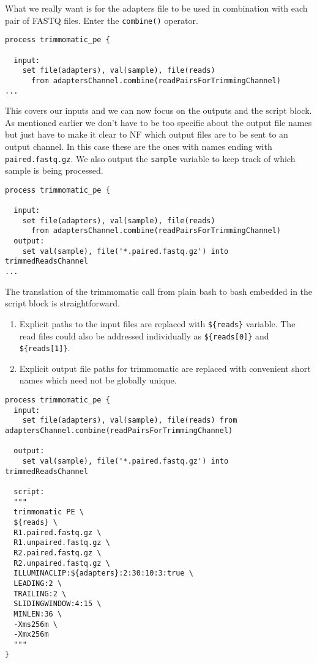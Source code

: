 What we really want is for the adapters file to be used in combination with 
each pair of FASTQ files. Enter the \texttt{combine()} operator.

\begin{lstlisting}
process trimmomatic_pe {

  input:
    set file(adapters), val(sample), file(reads) 
      from adaptersChannel.combine(readPairsForTrimmingChannel)
...
\end{lstlisting}

This covers our inputs and we can now focus on the outputs and the script block.
As mentioned earlier we don't have to be too specific about the output file names 
but just have to make it clear to NF which output files are to be sent to an output channel.
In this case these are the ones with names ending with \texttt{paired.fastq.gz}.
We also output the \texttt{sample} variable to keep track of which sample is being processed.

\begin{lstlisting}
process trimmomatic_pe {

  input:
    set file(adapters), val(sample), file(reads) 
      from adaptersChannel.combine(readPairsForTrimmingChannel)
  output:
    set val(sample), file('*.paired.fastq.gz') into trimmedReadsChannel
...
\end{lstlisting}

The translation of the trimmomatic call from plain bash to bash embedded in the script block 
is straightforward. 

\begin{enumerate}
 \item Explicit paths to the input files are replaced with \texttt{\$\{reads\}} variable. The read files could also be addressed individually as \texttt{\$\{reads[0]\}} and \texttt{\$\{reads[1]\}}.
 \item Explicit output file paths for trimmomatic are replaced with convenient short names which need not be globally unique. 
\end{enumerate}



\begin{lstlisting}
process trimmomatic_pe {
  input:
    set file(adapters), val(sample), file(reads) from adaptersChannel.combine(readPairsForTrimmingChannel)

  output:
    set val(sample), file('*.paired.fastq.gz') into trimmedReadsChannel

  script:
  """
  trimmomatic PE \
  ${reads} \
  R1.paired.fastq.gz \
  R1.unpaired.fastq.gz \
  R2.paired.fastq.gz \
  R2.unpaired.fastq.gz \
  ILLUMINACLIP:${adapters}:2:30:10:3:true \
  LEADING:2 \
  TRAILING:2 \
  SLIDINGWINDOW:4:15 \
  MINLEN:36 \
  -Xms256m \
  -Xmx256m
  """
}
\end{lstlisting}



